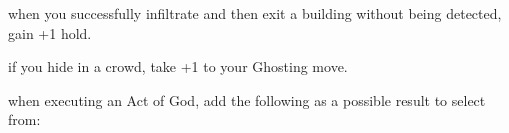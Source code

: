 \begin{dossier}
\begin{dossiermovebar}
\begin{moveoptions}
\end{moveoptions}

 when you
successfully infiltrate and then exit a  building
without being detected, gain +1 hold.

 if you hide in a
crowd, take +1 to your Ghosting move.

 when executing an
Act of God, add the following as a possible result
to select from:
\begin{moveoptions}
\end{moveoptions}

\end{dossiermovebar}%
\end{dossier}

